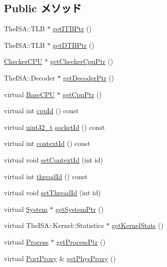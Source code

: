 \subsection*{Public メソッド}
\begin{DoxyCompactItemize}
\item 
TheISA::TLB $\ast$ \hyperlink{classO3ThreadContext_a95b7e95d0558cd03d69613142fff9137}{getITBPtr} ()
\item 
TheISA::TLB $\ast$ \hyperlink{classO3ThreadContext_a2fe6a07c44bc2a4d83b86bea605ba971}{getDTBPtr} ()
\item 
\hyperlink{classCheckerCPU}{CheckerCPU} $\ast$ \hyperlink{classO3ThreadContext_a0807ebbe39e158fdf6007ca00e3f7252}{getCheckerCpuPtr} ()
\item 
TheISA::Decoder $\ast$ \hyperlink{classO3ThreadContext_a6ae33963bc5f8b515f0a50c483f21c7f}{getDecoderPtr} ()
\item 
virtual \hyperlink{classBaseCPU}{BaseCPU} $\ast$ \hyperlink{classO3ThreadContext_ad44672c1d449c22e612a0d29a64891e6}{getCpuPtr} ()
\item 
virtual int \hyperlink{classO3ThreadContext_a380902de24674abc2125ffb1adc81528}{cpuId} () const 
\item 
virtual \hyperlink{Type_8hh_a435d1572bf3f880d55459d9805097f62}{uint32\_\-t} \hyperlink{classO3ThreadContext_ac778b8592630d93d3cecb6a663a6f038}{socketId} () const 
\item 
virtual int \hyperlink{classO3ThreadContext_a6112c7e72d0367debf95bc85bd28b31a}{contextId} () const 
\item 
virtual void \hyperlink{classO3ThreadContext_a5dddb107b15d8fe6fc941ed0b9654fd2}{setContextId} (int id)
\item 
virtual int \hyperlink{classO3ThreadContext_a4ea132a82460e5b862e551541cecde9e}{threadId} () const 
\item 
virtual void \hyperlink{classO3ThreadContext_ad657dfeae3efbb82eeb0b82b1337217a}{setThreadId} (int id)
\item 
virtual \hyperlink{classSystem}{System} $\ast$ \hyperlink{classO3ThreadContext_a8ff008929430425aaac3dc6f718be62c}{getSystemPtr} ()
\item 
virtual TheISA::Kernel::Statistics $\ast$ \hyperlink{classO3ThreadContext_ab24a9f94beeda4c4a7bcf576a75be32a}{getKernelStats} ()
\item 
virtual \hyperlink{classProcess}{Process} $\ast$ \hyperlink{classO3ThreadContext_aad103282d1faec25766034788dd59911}{getProcessPtr} ()
\item 
virtual \hyperlink{classPortProxy}{PortProxy} \& \hyperlink{classO3ThreadContext_ad157aa6157fa2020e52d8349e448df28}{getPhysProxy} ()

\end{DoxyCompactItemize}
